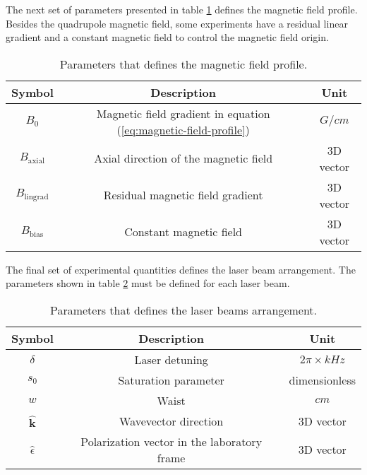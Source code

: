 The next set of parameters presented in table \ref{tab:magnetic-field-profile-parameters} defines the magnetic field profile. Besides the quadrupole magnetic field, some experiments have a residual linear gradient and a constant magnetic field to control the magnetic field origin.
\begin{table}[ht!]
    \centering
    \begin{tabular}{|c|c|c|}
        \hline
        \textbf{Symbol} & \textbf{Description} & \textbf{Unit} \\ \hline
        $ B_0 $ & Magnetic field gradient in equation (\ref{eq:magnetic-field-profile}) & $ G/cm $ \\
        $ B_{\textrm{axial}} $ & Axial direction of the magnetic field & 3D vector \\
        $ B_{\textrm{lingrad}} $ & Residual magnetic field gradient & 3D vector \\
        $ B_{\textrm{bias}} $ & Constant magnetic field & 3D vector \\
        \hline
    \end{tabular}
    \caption{Parameters that defines the magnetic field profile.}
    \label{tab:magnetic-field-profile-parameters}
\end{table}

The final set of experimental quantities defines the laser beam arrangement. The parameters shown in table \ref{tab:laser-beams-arrangement-parameters} must be defined for each laser beam.
\begin{table}[ht!]
    \centering
    \begin{tabular}{|c|c|c|}
        \hline
        \textbf{Symbol} & \textbf{Description} & \textbf{Unit} \\ \hline
        $ \delta $ & Laser detuning & $ 2\pi \times kHz $ \\
        $ s_0 $ & Saturation parameter & dimensionless \\
        $ w $ & Waist & $ cm $ \\
        $ \hat{\mathbf{k}} $ & Wavevector direction & 3D vector \\
        $ \hat{\epsilon} $ & Polarization vector in the laboratory frame & 3D vector \\
        \hline
    \end{tabular}
    \caption{Parameters that defines the laser beams arrangement.}
    \label{tab:laser-beams-arrangement-parameters}
\end{table}

